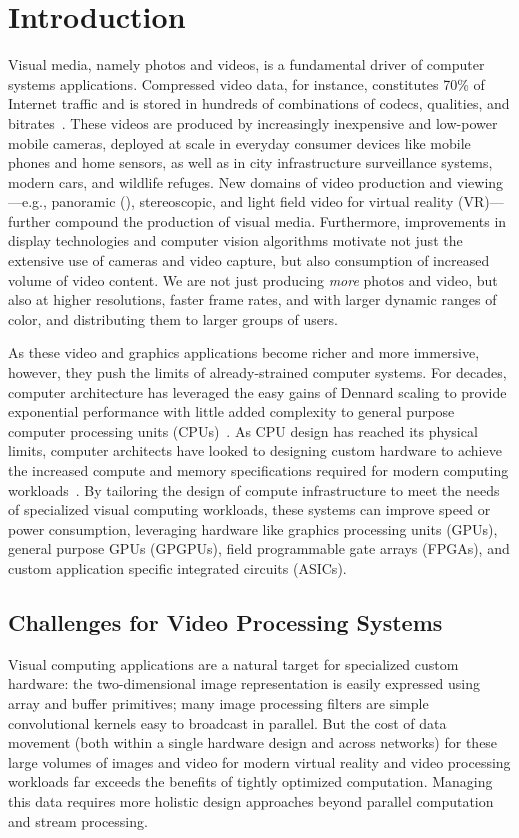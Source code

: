 \chapter{Introduction}\label{ch:introduction}
Visual media, namely photos and videos, is a fundamental driver of computer systems applications.
Compressed video data, for instance, constitutes 70\% of Internet traffic and is stored in hundreds of combinations of codecs, qualities, and bitrates~\cite{netflix2015encoding, cisco2017zettabyte}.
These videos are produced by increasingly inexpensive and low-power mobile cameras, deployed at scale in everyday consumer devices like mobile phones and home sensors, as well as in city infrastructure surveillance systems, modern cars, and wildlife refuges.
New domains of video production and viewing---e.g., panoramic (\threesixty), stereoscopic, and light field video for virtual reality (VR)---further compound the production of visual media.
Furthermore, improvements in display technologies and computer vision algorithms motivate not just the extensive use of cameras and video capture, but also consumption of increased volume of video content.
We are not just producing \emph{more} photos and video, but also at higher resolutions, faster frame rates, and with larger dynamic ranges of color, and distributing them to larger groups of users.

As these video and graphics applications become richer and more immersive, however, they push the limits of already-strained computer systems.
For decades, computer architecture has leveraged the easy gains of Dennard scaling to provide exponential performance with little added complexity to general purpose computer processing units (CPUs)~\cite{esmaeilzadeh2011dark}.
As CPU design has reached its physical limits, computer architects have looked to designing custom hardware to achieve the increased compute and memory specifications required for modern computing workloads~\cite{tpu, q100, qadeer}.
By tailoring the design of compute infrastructure to meet the needs of specialized visual computing workloads, these systems can improve speed or power consumption, leveraging hardware like graphics processing units (GPUs), general purpose GPUs (GPGPUs), field programmable gate arrays (FPGAs), and custom application specific integrated circuits (ASICs).

\section{Challenges for Video Processing Systems}
Visual computing applications are a natural target for specialized custom hardware: the two-dimensional image representation is easily expressed using array and buffer primitives; many image processing filters are simple convolutional kernels easy to broadcast in parallel.
But the cost of data movement (both within a single hardware design and across networks) for these large volumes of images and video for modern virtual reality and video processing workloads far exceeds the benefits of tightly optimized computation.
Managing this data requires more holistic design approaches beyond parallel computation and stream processing.

